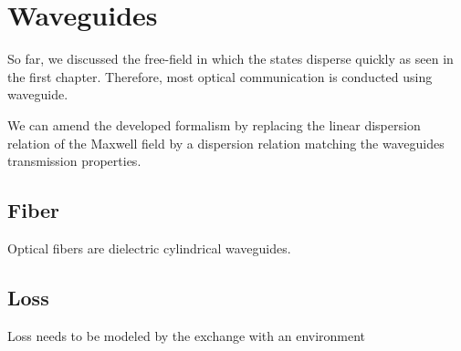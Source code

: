 \section{Waveguides}

So far, we discussed the free-field in which the states disperse quickly as seen in the first chapter.
Therefore, most optical communication is conducted using waveguide.

We can amend the developed formalism by replacing the linear dispersion relation of the Maxwell field by a dispersion relation matching the waveguides transmission properties.

\subsection{Fiber}

Optical fibers are dielectric cylindrical waveguides.

\subsection{Loss}

Loss needs to be modeled by the exchange with an environment